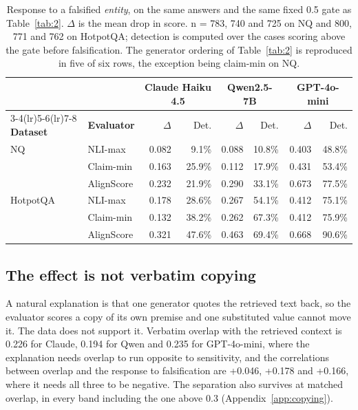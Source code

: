 \documentclass[11pt]{article}
\begin{document}
\begin{table}[t]
\centering
\small
\begin{tabular}{llrrrrrr}
\toprule
 & & \multicolumn{2}{c}{\textbf{Claude Haiku 4.5}} & \multicolumn{2}{c}{\textbf{Qwen2.5-7B}} & \multicolumn{2}{c}{\textbf{GPT-4o-mini}} \\
\cmidrule(lr){3-4}\cmidrule(lr){5-6}\cmidrule(lr){7-8}
\textbf{Dataset} & \textbf{Evaluator} & $\Delta$ & Det. & $\Delta$ & Det. & $\Delta$ & Det. \\
\midrule
NQ & NLI-max & 0.082 & 9.1\% & 0.088 & 10.8\% & 0.403 & 48.8\% \\
 & Claim-min & 0.163 & 25.9\% & 0.112 & 17.9\% & 0.431 & 53.4\% \\
 & AlignScore & 0.232 & 21.9\% & 0.290 & 33.1\% & 0.673 & 77.5\% \\
\midrule
HotpotQA & NLI-max & 0.178 & 28.6\% & 0.267 & 54.1\% & 0.412 & 75.1\% \\
 & Claim-min & 0.132 & 38.2\% & 0.262 & 67.3\% & 0.412 & 75.9\% \\
 & AlignScore & 0.321 & 47.6\% & 0.463 & 69.4\% & 0.668 & 90.6\% \\
\bottomrule
\end{tabular}
\caption{Response to a falsified \emph{entity}, on the same answers and the same fixed 0.5 gate as Table~\ref{tab:2}. $\Delta$ is the mean drop in score. n = 783, 740 and 725 on NQ and 800, 771 and 762 on HotpotQA; detection is computed over the cases scoring above the gate before falsification. The generator ordering of Table~\ref{tab:2} is reproduced in five of six rows, the exception being claim-min on NQ.}
\label{tab:entity}
\end{table}


\subsection{The effect is not verbatim copying}
\label{sec:copying}

A natural explanation is that one generator quotes the retrieved text back, so the evaluator scores a copy of its own premise and one substituted value cannot move it. The data does not support it. Verbatim overlap with the retrieved context is 0.226 for Claude, 0.194 for Qwen and 0.235 for GPT-4o-mini, where the explanation needs overlap to run opposite to sensitivity, and the correlations between overlap and the response to falsification are +0.046, +0.178 and +0.166, where it needs all three to be negative. The separation also survives at matched overlap, in every band including the one above 0.3 (Appendix~\ref{app:copying}).
\end{document}

